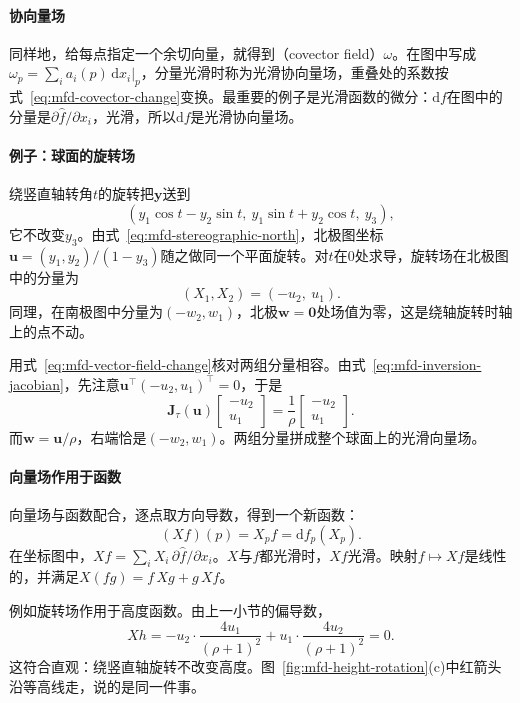 \paragraph{协向量场}
同样地，给每点指定一个余切向量，就得到（covector field）$\omega$。在图中写成$\omega_p=\sum_ia_i(p)\,\mathrm dx_i|_p$，分量光滑时称为光滑协向量场，重叠处的系数按式~\eqref{eq:mfd-covector-change}变换。最重要的例子是光滑函数的微分：$\mathrm df$在图中的分量是$\partial\hat f/\partial x_i$，光滑，所以$\mathrm df$是光滑协向量场。

\paragraph{例子：球面的旋转场}
绕竖直轴转角$t$的旋转把$\bm y$送到
\[
(y_1\cos t-y_2\sin t,\ y_1\sin t+y_2\cos t,\ y_3),
\]
它不改变$y_3$。由式~\eqref{eq:mfd-stereographic-north}，北极图坐标$\bm u=(y_1,y_2)/(1-y_3)$随之做同一个平面旋转。对$t$在$0$处求导，旋转场在北极图中的分量为
\begin{equation}
(X_1,X_2)=(-u_2,\ u_1).
\label{eq:mfd-rotation-north}
\end{equation}
同理，在南极图中分量为$(-w_2,w_1)$，北极$\bm w=\bm0$处场值为零，这是绕轴旋转时轴上的点不动。

用式~\eqref{eq:mfd-vector-field-change}核对两组分量相容。由式~\eqref{eq:mfd-inversion-jacobian}，先注意$\bm u^\top(-u_2,u_1)^\top=0$，于是
\[
\bm J_\tau(\bm u)\begin{bmatrix}-u_2\\u_1\end{bmatrix}
=\frac{1}{\rho}\begin{bmatrix}-u_2\\u_1\end{bmatrix}.
\]
而$\bm w=\bm u/\rho$，右端恰是$(-w_2,w_1)$。两组分量拼成整个球面上的光滑向量场。

\paragraph{向量场作用于函数}
向量场与函数配合，逐点取方向导数，得到一个新函数：
\begin{equation}
(Xf)(p)=X_pf=\mathrm df_p(X_p).
\label{eq:mfd-field-on-function}
\end{equation}
在坐标图中，$Xf=\sum_iX_i\,\partial\hat f/\partial x_i$。$X$与$f$都光滑时，$Xf$光滑。映射$f\mapsto Xf$是线性的，并满足$X(fg)=f\,Xg+g\,Xf$。

例如旋转场作用于高度函数。由上一小节的偏导数，
\[
Xh=-u_2\cdot\frac{4u_1}{(\rho+1)^2}+u_1\cdot\frac{4u_2}{(\rho+1)^2}=0 .
\]
这符合直观：绕竖直轴旋转不改变高度。图~\ref{fig:mfd-height-rotation}(c)中红箭头沿等高线走，说的是同一件事。

